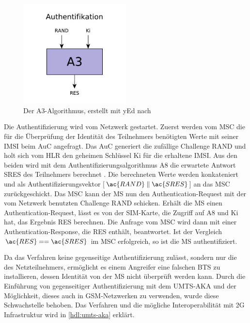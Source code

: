 \begin{figure}[H]
  \begin{center}
    \includegraphics[width=0.5\textwidth]{figures/gsm_a3.pdf}
  \end{center}
  \caption[Der A3-Algorithmus]{Der \ac{A3}-Algorithmus, erstellt mit yEd nach } \label{fig:a3-algorithm}
\end{figure}

Die Authentifizierung wird vom Netzwerk gestartet. Zuerst werden vom \ac{MSC} die für die Überprüfung der Identität des Teilnehmers benötigten Werte mit seiner \ac{IMSI} beim \ac{AuC} angefragt. Das \ac{AuC} generiert die zufällige Challenge \ac{RAND} und holt sich vom \ac{HLR} den geheimen Schlüssel \ac{Ki} für die erhaltene \ac{IMSI}. Aus den beiden wird mit dem Authentifizierungsalgorithmus \ac{A8} die erwartete Antwort \ac{SRES} des Teilnehmers berechnet . Die berechneten Werte werden konkateniert und als Authentifizierungsvektor [$\ac{RAND}\parallel\ac{SRES}$] an das \ac{MSC} zurückgeschickt. Das \ac{MSC} kann der \ac{MS} nun den Authentication-Request mit der vom Netzwerk benutzten Challenge \ac{RAND} schicken. Erhält die \ac{MS} einen Authentication-Request, lässt es von der \ac{SIM}-Karte, die Zugriff auf \ac{A8} und \ac{Ki} hat, das Ergebnis \ac{RES} berechnen. Die Anfrage vom \ac{MSC} wird dann mit einer Authentication-Response, die \ac{RES} enthält, beantwortet. Ist der Vergleich $\ac{RES} == \ac{SRES}$ im \ac{MSC} erfolgreich, so ist die \ac{MS} authentifiziert.

Da das Verfahren keine gegenseitige Authentifizierung zulässt, sondern nur die des Netzteilnehmers, ermöglicht es einem Angreifer eine falschen \ac{BTS} zu installieren, dessen Identität von der \ac{MS} nicht überprüft werden kann. Durch die Einführung von gegenseitiger Authentifizierung mit dem \ac{UMTS}-\ac{AKA} und der Möglichkeit, dieses auch in \ac{GSM}-Netzwerken zu verwenden, wurde diese Schwachstelle behoben. Das Verfahren und die mögliche Interoperabilität mit 2G Infrastruktur wird in \autoref{hdl:umts-aka} erklärt.

